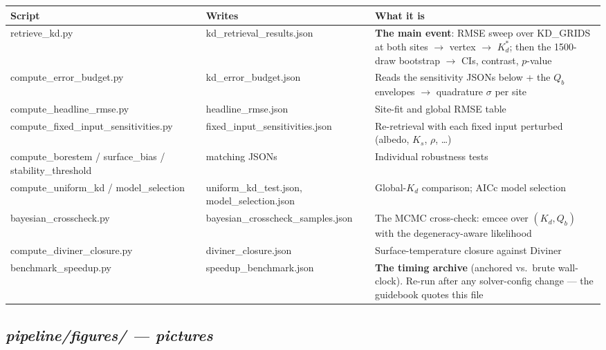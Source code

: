 \documentclass[11pt]{article}
\newcommand{\code}[1]{{\ttfamily\small #1}}
\begin{document}
\begin{center}\small
\begin{tabularx}{\textwidth}{@{}>{\ttfamily\scriptsize}l >{\ttfamily\scriptsize\color{dim}}l X@{}}
\toprule
\textnormal{\textbf{Script}} & \textnormal{\textbf{Writes}} & \textnormal{\textbf{What it is}} \\
\midrule
retrieve\_kd.py & kd\_retrieval\_\allowbreak results.json & \textnormal{\textbf{The main event}}: RMSE sweep over \code{KD\_GRIDS} at both sites $\rightarrow$ vertex $\rightarrow$ $K_d^{*}$; then the 1500-draw bootstrap $\rightarrow$ CIs, contrast, $p$-value \\
compute\_error\_\allowbreak budget.py & kd\_error\_\allowbreak budget.json & Reads the sensitivity JSONs below + the $Q_b$ envelopes $\rightarrow$ quadrature $\sigma$ per site \\
compute\_headline\_\allowbreak rmse.py & headline\_\allowbreak rmse.json & Site-fit and global RMSE table \\
compute\_fixed\_input\_\allowbreak sensitivities.py & fixed\_input\_\allowbreak sensitivities.json & Re-retrieval with each fixed input perturbed (albedo, $K_s$, $\rho$, \ldots) \\
compute\_borestem / \allowbreak surface\_bias / \allowbreak stability\_threshold & matching JSONs & Individual robustness tests \\
compute\_uniform\_kd / \allowbreak model\_selection & uniform\_kd\_\allowbreak test.json, model\_\allowbreak selection.json & Global-$K_d$ comparison; AICc model selection \\
bayesian\_\allowbreak crosscheck.py & bayesian\_\allowbreak crosscheck\_\allowbreak samples.json & The MCMC cross-check: \code{emcee} over $(K_d,Q_b)$ with the degeneracy-aware likelihood \\
compute\_diviner\_\allowbreak closure.py & diviner\_\allowbreak closure.json & Surface-temperature closure against Diviner \\
benchmark\_\allowbreak speedup.py & speedup\_\allowbreak benchmark.json & \textnormal{\textbf{The timing archive}} (anchored vs.\ brute wall-clock). Re-run after any solver-config change --- the guidebook quotes this file \\
\bottomrule
\end{tabularx}
\end{center}

\subsection*{\normalfont\itshape pipeline/figures/ --- pictures}
\end{document}
